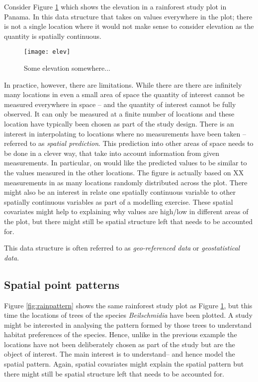 Consider Figure \ref{fig:elev} which shows the elevation in a rainforest study plot in Panama. In this data structure that  takes on values everywhere in the plot; there is not a single location where it would not make sense to consider elevation as the quantity is spatially continuous.
\begin{figure}
\centering
\texttt{[image: elev]}
\caption{\label{fig:elev} Some elevation somewhere...}
\end{figure}
In practice, however, there are limitations. While there are there are infinitely many locations in even a small area of space the quantity of interest cannot be measured everywhere in space -- and the quantity of interest cannot be fully observed. It can only be measured at a finite number of locations and these location have typically been chosen as part of the study design. There is an interest in interpolating to locations where no measurements have been taken -- referred to as \textit{spatial prediction}. This prediction into other areas of space needs to be done in a clever way, that take into account information from given measurements. In particular, on would like the predicted values to be similar to the values measured in the other locations. The figure is actually based on XX measurements in as many locations randomly distributed across the plot. There might also be an interest in relate one spatially continuous variable to other spatially continuous variables as part of a modelling exercise. These spatial covariates might help to explaining why values are high/low in different areas of the plot, but there might still be spatial structure left that needs to be accounted for.

This data structure is often referred to as \textit{geo-referenced data} or \textit{geostatistical data}.

\subsection{Spatial point patterns}
Figure \ref{fig:rainpattern} shows  the same rainforest study plot as Figure \ref{fig:elev}, but this time the locations of trees of the species \textit{Beilschmidia} have been plotted. A study might be interested in analysing the pattern formed by those trees to understand habitat preferences of the species. Hence, unlike in the previous example the locations have not been deliberately chosen as part of the study but are the object of interest. The main interest is to understand-- and hence model the spatial pattern.
Again, spatial covariates might explain the spatial pattern but there might still be spatial structure left that needs to be accounted for.

